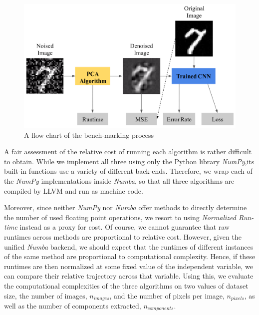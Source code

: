 \documentclass[12pt]{article}
\begin{document}
    \begin{figure}[H]
    \begin{center}
    \includegraphics[width=\textwidth]{Methodology.png}
    \caption{A flow chart of the bench-marking process}
    \label{methodology}
    \end{center}
    \end{figure}
    
    A fair assessment of the relative cost of running each algorithm is rather difficult to obtain. While we implement all three using only the Python library \textit{NumPy},its built-in functions use a variety of different back-ends. Therefore, we wrap each of the \textit{NumPy} implementations inside \textit{Numba}, so that all three algorithms are compiled by LLVM and run as machine code. 
    
    Moreover, since neither \textit{NumPy} nor \textit{Numba} offer methods to directly determine the number of used floating point operations, we resort to using \textit{Normalized Run-time} instead as a proxy for cost. Of course, we cannot guarantee that raw runtimes across methods are proportional to relative cost. However, given the unified \textit{Numba} backend, we should expect that the runtimes of different instances of the same method are proportional to computational complexity. Hence, if these runtimes are then normalized at some fixed value of the independent variable, we can compare their relative trajectory across that variable. Using this, we evaluate the computational complexities of the three algorithms on two values of dataset size, the number of images, $n_{images}$, and the number of pixels per image, $n_{pixels}$, as well as the number of components extracted, $n_{components}$.
    
\end{document}
